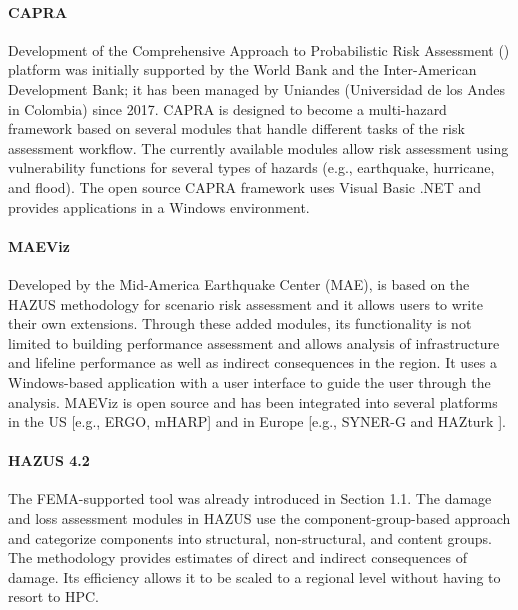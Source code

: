 \paragraph{CAPRA} Development of the Comprehensive Approach to Probabilistic Risk Assessment () platform was initially supported by the World Bank and the Inter-American Development Bank; it has been managed by Uniandes (Universidad de los Andes in Colombia) since 2017. CAPRA is designed to become a multi-hazard framework based on several modules that handle different tasks of the risk assessment workflow. The currently available modules allow risk assessment using vulnerability functions for several types of hazards (e.g., earthquake, hurricane, and flood). The open source CAPRA framework uses Visual Basic .NET and provides applications in a Windows environment.

\paragraph{MAEViz} 
Developed by the Mid-America Earthquake Center (MAE),  is based on the HAZUS methodology for scenario risk assessment and it allows users to write their own extensions. Through these added modules, its functionality is not limited to building performance assessment and allows analysis of infrastructure and lifeline performance as well as indirect consequences in the region. It uses a Windows-based application with a user interface to guide the user through the analysis. MAEViz is open source and has been integrated into several platforms in the US [e.g., ERGO, mHARP] and in Europe [e.g., SYNER-G \citep{pitilakis2014synerg} and HAZturk \citep{karaman2008earthquake}].

\paragraph{HAZUS 4.2} The FEMA-supported  tool was already introduced in Section 1.1. The damage and loss assessment modules in HAZUS use the component-group-based approach and categorize components into structural, non-structural, and content groups. The methodology provides estimates of direct and indirect consequences of damage. Its efficiency allows it to be scaled to a regional level without having to resort to HPC.

